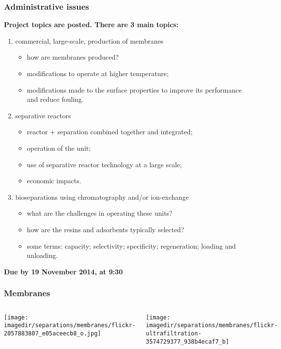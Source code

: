 \begin{frame}\frametitle{Administrative issues}
	\textbf{Project topics are posted. There are 3 main topics: }
		\begin{enumerate}
			\item	commercial, large-scale, production of membranes
				\begin{itemize}
					\item	how are membranes produced?
					\item	modifications to operate at higher temperature;
					\item	modifications made to the surface properties to improve its performance and reduce fouling.
				\end{itemize}
			\item	separative reactors
			\begin{itemize}
				\item	reactor + separation combined together and integrated;
				\item	operation of the unit; 
				\item	use of separative reactor technology at a large scale;
				\item	economic impacts.
			\end{itemize}
			\item	bioseparations using chromatography and/or ion-exchange
			\begin{itemize}
				\item	what are the challenges in operating these units? 
				\item	how are the resins and adsorbents typically selected?
				\item	some terms: capacity; selectivity; specificity; regeneration; loading and unloading.
			\end{itemize}
		\end{enumerate}
	\textbf{Due by 19 November 2014, at 9:30}
	
\end{frame}

\begin{frame}\frametitle{Membranes}
	\begin{columns}[c]
			\begin{center}
				\texttt{[image: \\imagedir/separations/membranes/flickr-2057883807\_e05aceecb8\_o.jpg]}
			\end{center}
			\begin{center}
				\texttt{[image: \\imagedir/separations/membranes/flickr-ultrafiltration-3574729377\_938b4ecaf7\_b]}
			\end{center}
	\end{columns}
\end{frame}

